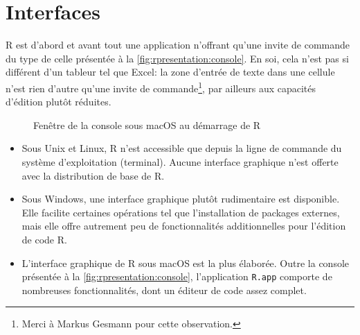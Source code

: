 \documentclass[11pt,article,french]{memoir}
\begin{document}
\section{Interfaces}
\label{sec:rpresentation:interfaces}

R est d'abord et avant tout une application n'offrant qu'une invite de
commande du type de celle présentée à la
\autoref{fig:rpresentation:console}. En soi, cela n'est pas si
différent d'un tableur tel que Excel: la zone d'entrée de texte dans
une cellule n'est rien d'autre qu'une invite de commande\footnote{%
  Merci à Markus Gesmann pour cette observation.}, par ailleurs aux
capacités d'édition plutôt réduites.

\begin{figure}
  \centering
  \caption{Fenêtre de la console sous macOS au démarrage de R}
  \label{fig:rpresentation:console}
\end{figure}

\begin{itemize}
\item Sous Unix et Linux, R n'est accessible que depuis la ligne de
  commande du système d'exploitation (terminal). Aucune interface
  graphique n'est offerte avec la distribution de base de R.
\item Sous Windows, une interface graphique plutôt rudimentaire est
  disponible. Elle facilite certaines opérations tel que
  l'installation de packages externes, mais elle offre autrement peu
  de fonctionnalités additionnelles pour l'édition de code R.
\item L'interface graphique de R sous macOS est la plus élaborée.
  Outre la console présentée à la
  \autoref{fig:rpresentation:console}, l'application \texttt{R.app}
  comporte de nombreuses fonctionnalités, dont un éditeur de code
  assez complet.
\end{itemize}
\end{document}
